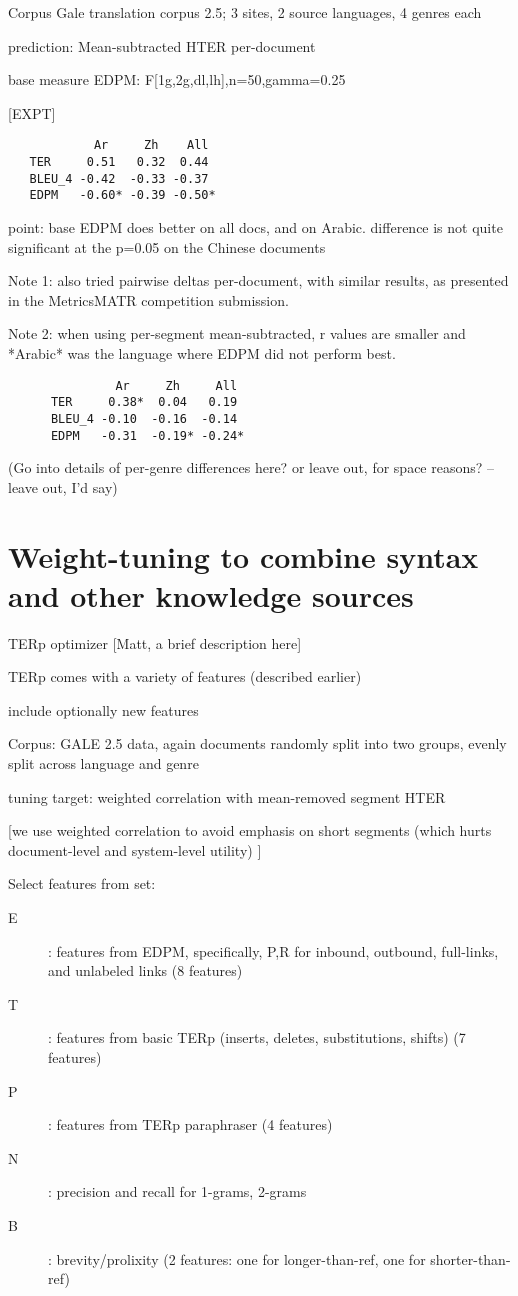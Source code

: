 \documentclass{kluwer}    %
\begin{document}
\begin{article}
  Corpus
    Gale translation corpus 2.5; 3 sites, 2 source languages, 4 genres each

  prediction:
    Mean-subtracted HTER per-document

  base measure EDPM: F[1g,2g,dl,lh],n=50,gamma=0.25

  [EXPT]
\begin{verbatim}
            Ar     Zh    All
   TER     0.51   0.32  0.44
   BLEU_4 -0.42  -0.33 -0.37
   EDPM   -0.60* -0.39 -0.50*
\end{verbatim}
  point: base EDPM does better on all docs, and on Arabic. difference
  is not quite significant at the p=0.05 on the Chinese documents

  Note 1: also tried pairwise deltas per-document, with similar
  results, as presented in the MetricsMATR competition submission.

  Note 2: when using per-segment mean-subtracted, r values are smaller
  and *Arabic* was the language where EDPM did not perform best.

\begin{verbatim}
               Ar     Zh     All
      TER     0.38*  0.04   0.19
      BLEU_4 -0.10  -0.16  -0.14
      EDPM   -0.31  -0.19* -0.24*
\end{verbatim}

  (Go into details of per-genre differences here? or leave out, for
  space reasons? -- leave out, I'd say)

\section{Weight-tuning to combine syntax and other knowledge sources}

TERp optimizer [Matt, a brief description here]

TERp comes with a variety of features (described earlier)

include optionally new features

Corpus: GALE 2.5 data, again documents randomly split into two groups,
evenly split across language and genre

tuning target: weighted correlation with mean-removed segment HTER

[we use weighted correlation to avoid emphasis on short segments
(which hurts document-level and system-level utility) ]

Select features from set:

\begin{description}
\item[E]: features from EDPM, specifically, P,R for inbound, outbound,
  full-links, and unlabeled links  (8 features)
\item[T]: features from basic TERp
  (inserts, deletes, substitutions, shifts)  (7 features)
\item[P]: features from TERp paraphraser
  (4 features)
\item[N]: precision and recall for 1-grams, 2-grams
\item[B]: brevity/prolixity (2 features: one for longer-than-ref, one for
  shorter-than-ref)
\end{description}


\end{article}
\end{document}
